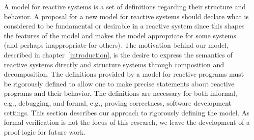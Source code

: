 A model for reactive systems is a set of definitions regarding their structure and behavior.
A proposal for a new model for reactive systems should declare what is considered to be fundamental or desirable in a reactive system since this shapes the features of the model and makes the model appropriate for some systems (and perhaps inappropriate for others).
The motivation behind our model, described in chapter~\ref{introduction}, is the desire to express the semantics of reactive systems directly and structure systems through composition and decomposition.
The definitions provided by a model for reactive programs must be rigorously defined to allow one to make precise statements about reactive programs and their behavior.
The definitions are necessary for both informal, e.g., debugging, and formal, e.g., proving correctness, software development settings.
This section describes our approach to rigorously defining the model.
As formal verification is not the focus of this research, we leave the development of a proof logic for future work.


